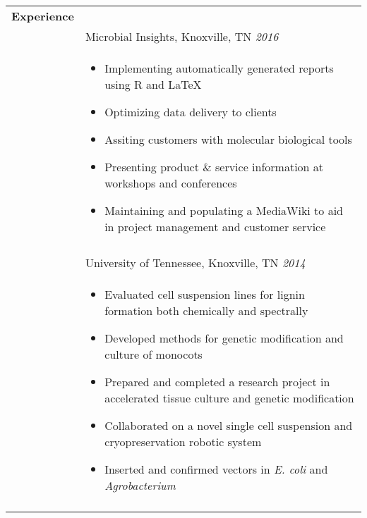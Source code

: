 \documentclass[10pt]{article}
\begin{document}
\begin{minipage}[ht]{.75\linewidth}
   \bgroup
   \def\arraystretch{.8}
   \begin{tabularx}{\linewidth}{p{1.8cm}M}
      \hline
      \textbf{Experience} &  \\
      & Microbial Insights, Knoxville, TN \textit{2016} \\
      & \begin{itemize}[topsep=-12pt,parsep=0em]
            \setlength\itemsep{0em}
            \item Implementing automatically generated reports using R and \LaTeX %
            \item Optimizing data delivery to clients %
            \item Assiting customers with molecular biological tools %
            \item Presenting product \& service information at workshops and conferences %
            \item Maintaining and populating a MediaWiki to aid in project management and customer service 
        \end{itemize} \\ 
       &  \\
       & University of Tennessee, Knoxville, TN \textit{2014} \\
       & \begin{itemize}[topsep=-12pt,parsep=0em]
            \setlength\itemsep{0em}
            \item Evaluated cell suspension lines for lignin formation both chemically and spectrally
            \item Developed methods for genetic modification and culture of monocots
            \item Prepared and completed a research project in accelerated tissue culture and genetic modification
            \item Collaborated on a novel single cell suspension and cryopreservation robotic system
            \item {Inserted and confirmed vectors in \textit{E. coli} and \textit{Agrobacterium}}
         \end{itemize} \\
       &  \\

\end{tabularx}
\end{minipage}
\end{document}
